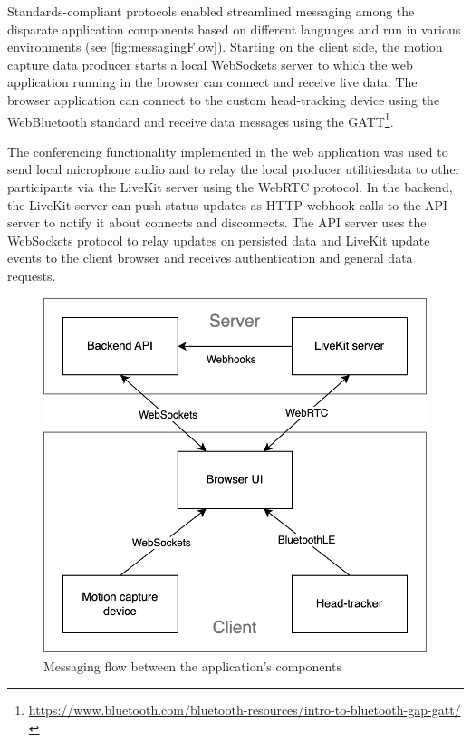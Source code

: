 Standards-compliant protocols enabled streamlined messaging among the disparate application components based on different languages and run in various environments (see \autoref{fig:messagingFlow}).
Starting on the client side, the motion capture data producer starts a local WebSockets server to which the web application running in the browser can connect and receive live data.
The browser application can connect to the custom head-tracking device using the WebBluetooth standard and receive data messages using the \ac{GATT}\footnote{\url{https://www.bluetooth.com/bluetooth-resources/intro-to-bluetooth-gap-gatt/}}.

The conferencing functionality implemented in the web application was used to send local microphone audio and to relay the local producer utilities\textquotesingle data to other participants via the LiveKit server using the WebRTC protocol.
In the backend, the LiveKit server can push status updates as \ac{HTTP} webhook calls to the \ac{API} server to notify it about connects and disconnects.
The \ac{API} server uses the WebSockets protocol to relay updates on persisted data and LiveKit update events to the client browser and receives authentication and general data requests.

\begin{figure}[h]
\centering
\includegraphics[scale=0.4]{04_Artefakte/01_Abbildungen/application-messaging-flow}
\caption[Application messaging flow]{Messaging flow between the application's components\protect}
\label{fig:messagingFlow}
\end{figure}

